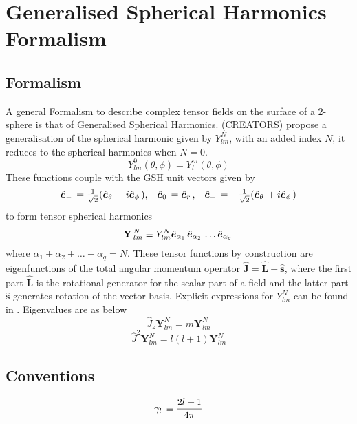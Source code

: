 \chapter{Generalised Spherical Harmonics Formalism}\label{app_gsh}

\section{Formalism}
A general Formalism to describe complex tensor fields on the surface of a 2-sphere is that of Generalised Spherical Harmonics. (CREATORS) propose a generalisation of the spherical harmonic given by $Y_{lm}^N$, with an added index $N$, it reduces to the spherical harmonics when $N=0$.
\begin{equation}
Y_{lm}^0(\theta,\phi) = Y_l^m(\theta,\phi)
\end{equation}
These functions couple with the GSH unit vectors given by
\begin{equation}
\begin{array}{ccc} \hat{\bm{e}}_{-}\, = \frac{1}{\sqrt{2}}(\hat{\bm{e}}_{\theta}\, - i \hat{\bm{e}}_{\phi}\,), & \hat{\bm{e}}_{0}\, = \hat{\bm{e}}_{r}\,, & \hat{\bm{e}}_{+}\, = -\frac{1}{\sqrt{2}}(\hat{\bm{e}}_{\theta}\, + i \hat{\bm{e}}_{\phi}\,) \\ \end{array}
\end{equation}
to form tensor spherical harmonics
\begin{equation}
\mathbf{Y}\,_{lm}^{N} \equiv Y_{lm}^{N} \hat{\bm{e}}_{\alpha_1}\,\hat{\bm{e}}_{\alpha_2}\, \ldots \hat{\bm{e}}_{\alpha_q}\,
\end{equation}
where $\alpha_1 + \alpha_2 +\ldots + \alpha_q = N$. These tensor functions by construction are eigenfunctions of the total angular momentum operator $\hat{\mathbf{J}} = \hat{\mathbf{L}} + \hat{\mathbf{s}}$, where the first part $\hat{\mathbf{L}}$ is the rotational generator for the scalar part of a field and the latter part $\hat{\mathbf{s}}$ generates rotation of the vector basis. Explicit expressions for $Y_{lm}^{N}$ can be found in \cite{DT98}. Eigenvalues are as below
\begin{equation}
\hat{J}_{z} \mathbf{Y}_{lm}^N = m\mathbf{Y}_{lm}^N
\end{equation}
\begin{equation}
\hat{J}^2 \mathbf{Y}_{lm}^N = l(l+1) \mathbf{Y}_{lm}^N
\end{equation}

\section{Conventions}
\begin{equation}
\gamma_{l}\, \equiv \frac{2l+1}{4\pi}
\end{equation}

